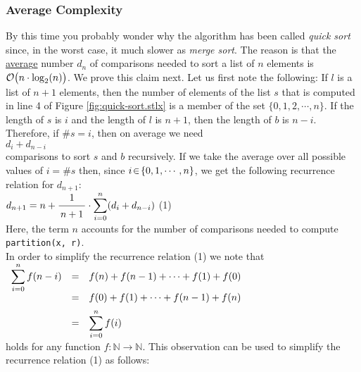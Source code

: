 \subsubsection{Average Complexity}
By this time you probably wonder why the algorithm has been called \emph{quick sort} since, in the worst case,
it much slower as \emph{merge sort}.  The reason is that the \underline{avera}g\underline{e} number $d_n$ of 
comparisons needed to sort a list of $n$ elements is $\mathcal{O}\bigl(n \cdot \log_2(n)\bigr)$. We prove
this claim next.  Let us first note the following: If $l$ is a list of $n+1$ elements, then the number of elements of the 
list $s$ that is computed in line 4 of Figure \ref{fig:quick-sort.stlx} is a member of the set 
$\{0,1,2,\cdots,n\}$.  If the length of $s$ is $i$ and the length of $l$ is $n+1$, then the length of
$b$ is $n-i$.  Therefore, if $\#s = i$, then on average we need
\\[0.2cm]
\hspace*{1.3cm} $d_i + d_{n-i}$ \\[0.2cm]
comparisons to sort $s$ and $b$ recursively.  If we take the average over all possible values of
 $i = \#s$ then, since $i \!\in\!\{0,1,\cdots,n\}$, we get the following recurrence relation for $d_{n+1}$:
\\[0.2cm]
\hspace*{1.3cm}
$\displaystyle d_{n+1} = n + \bruch{1}{n+1} \cdot \sum\limits_{i=0}^n (d_i + d_{n-i}) $ \hspace*{\fill} (1) 
\\[0.2cm] 
Here, the term $n$ accounts for the number of comparisons needed to compute 
\\[0.2cm]
\hspace*{1.3cm}
\texttt{partition(x, r)}.
\\[0.2cm]
In order to simplify the recurrence relation (1) we note that
\\[0.2cm]
\hspace*{1.3cm}
$
\begin{array}[t]{lcl}
 \displaystyle
 \sum\limits_{i=0}^n f(n-i) & = & f(n) + f(n-1) + \cdots + f(1) + f(0) \\[0.2cm]
                    & = & f(0) + f(1) + \cdots + f(n-1) + f(n) \\[0.2cm]
                    & = & \displaystyle \sum\limits_{i=0}^n f(i) 
\end{array}
$
\\[0.2cm]
holds for any function $f:\mathbb{N} \rightarrow \mathbb{N}$.
This observation can be used to simplify the recurrence relation (1) as follows:
